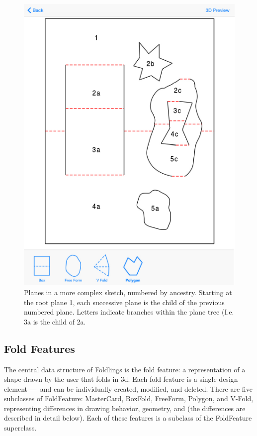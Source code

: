 \begin{figure}[htbp]
\centering
\includegraphics{figures/33_UI_Interface_Data_Structures/complex_sketch.pdf}
\caption{Planes in a more complex sketch, numbered by ancestry. Starting
at the root plane 1, each successive plane is the child of the previous
numbered plane. Letters indicate branches within the plane tree (I.e. 3a
is the child of 2a.}
\end{figure}

\subsection{Fold Features}\label{fold-features}

The central data structure of Foldlings is the fold feature: a
representation of a shape drawn by the user that folds in 3d. Each fold
feature is a single design element ---~and can be individually created,
modified, and deleted. There are five subclasses of FoldFeature:
MasterCard, BoxFold, FreeForm, Polygon, and V-Fold, representing
differences in drawing behavior, geometry, and (the differences are
described in detail below). Each of these features is a subclass of the
FoldFeature superclass.


